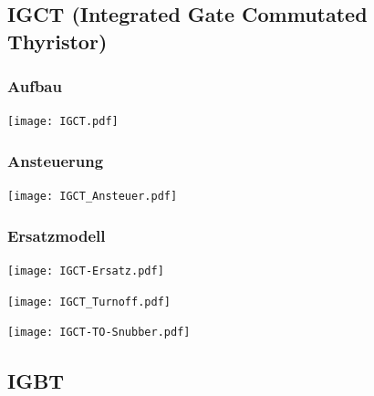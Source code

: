 \documentclass[german]{latex4ei_fs}
\begin{document}
\begin{sectionbox}
\subsection{IGCT (Integrated Gate Commutated Thyristor)}
\subsubsection*{Aufbau}
\texttt{[image: IGCT.pdf]}

\subsubsection*{Ansteuerung}
\texttt{[image: IGCT\_Ansteuer.pdf]}

\subsubsection*{Ersatzmodell}
\texttt{[image: IGCT-Ersatz.pdf]}

\texttt{[image: IGCT\_Turnoff.pdf]}

\texttt{[image: IGCT-TO-Snubber.pdf]}



\end{sectionbox}

\subsection{IGBT}
\end{document}
